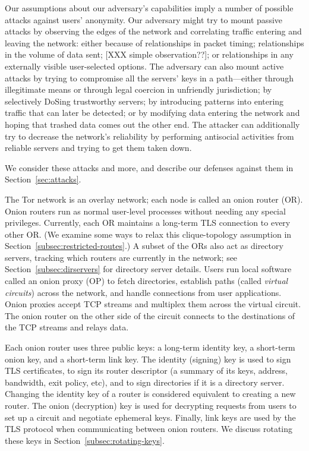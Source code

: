 \documentclass[times,10pt,twocolumn]{article}
\begin{document}
Our assumptions about our adversary's capabilities imply a number of
possible attacks against users' anonymity.  Our adversary might try to
mount passive attacks by observing the edges of the network and
correlating traffic entering and leaving the network: either because
of relationships in packet timing; relationships in the volume of data
sent; [XXX simple observation??]; or relationships in any externally
visible user-selected options.  The adversary can also mount active
attacks by trying to compromise all the servers' keys in a
path---either through illegitimate means or through legal coercion in
unfriendly jurisdiction; by selectively DoSing trustworthy servers; by
introducing patterns into entering traffic that can later be detected;
or by modifying data entering the network and hoping that trashed data
comes out the other end.  The attacker can additionally try to
decrease the network's reliability by performing antisocial activities
from reliable servers and trying to get them taken down.

We consider these attacks and more, and describe our defenses against them
in Section~\ref{sec:attacks}.



\label{sec:design}

The Tor network is an overlay network; each node is called an onion router
(OR). Onion routers run as normal user-level processes without needing
any special
privileges.  Currently, each OR maintains a long-term TLS connection
to every other
OR.  (We examine some ways to relax this clique-topology assumption in
Section~\ref{subsec:restricted-routes}.) A subset of the ORs also act as
directory servers, tracking which routers are currently in the network;
see Section~\ref{subsec:dirservers} for directory server details. Users
run local software called an onion proxy (OP) to fetch directories,
establish paths (called \emph{virtual circuits}) across the network,
and handle connections from user applications. Onion proxies accept
TCP streams and multiplex them across the virtual circuit. The onion
router on the other side 
of the circuit connects to the destinations of
the TCP streams and relays data.

Each onion router uses three public keys: a long-term identity key, a
short-term onion key, and a short-term link key.  The identity
(signing) key is used to sign TLS certificates, to sign its router
descriptor (a summary of its keys, address, bandwidth, exit policy,
etc), and to sign directories if it is a directory server. Changing
the identity key of a router is considered equivalent to creating a
new router. The onion (decryption) key is used for decrypting requests
from users to set up a circuit and negotiate ephemeral keys. Finally,
link keys are used by the TLS protocol when communicating between
onion routers.  We discuss rotating these keys in
Section~\ref{subsec:rotating-keys}.
\end{document}
